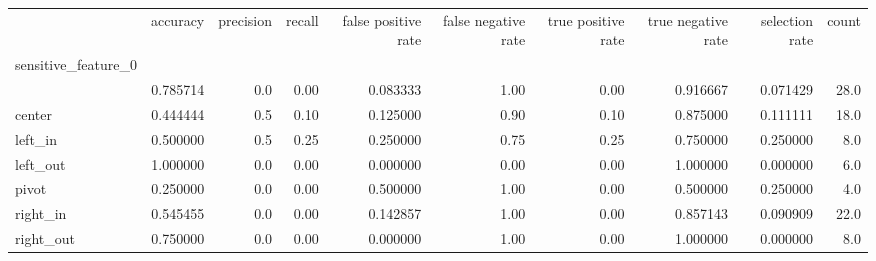 \begin{tabular}{lrrrrrrrrr}
\toprule
{} &  accuracy &  precision &  recall &  false positive rate &  false negative rate &  true positive rate &  true negative rate &  selection rate &  count \\
sensitive\_feature\_0 &           &            &         &                      &                      &                     &                     &                 &        \\
\midrule
                    &  0.785714 &        0.0 &    0.00 &             0.083333 &                 1.00 &                0.00 &            0.916667 &        0.071429 &   28.0 \\
center              &  0.444444 &        0.5 &    0.10 &             0.125000 &                 0.90 &                0.10 &            0.875000 &        0.111111 &   18.0 \\
left\_in             &  0.500000 &        0.5 &    0.25 &             0.250000 &                 0.75 &                0.25 &            0.750000 &        0.250000 &    8.0 \\
left\_out            &  1.000000 &        0.0 &    0.00 &             0.000000 &                 0.00 &                0.00 &            1.000000 &        0.000000 &    6.0 \\
pivot               &  0.250000 &        0.0 &    0.00 &             0.500000 &                 1.00 &                0.00 &            0.500000 &        0.250000 &    4.0 \\
right\_in            &  0.545455 &        0.0 &    0.00 &             0.142857 &                 1.00 &                0.00 &            0.857143 &        0.090909 &   22.0 \\
right\_out           &  0.750000 &        0.0 &    0.00 &             0.000000 &                 1.00 &                0.00 &            1.000000 &        0.000000 &    8.0 \\
\bottomrule
\end{tabular}
